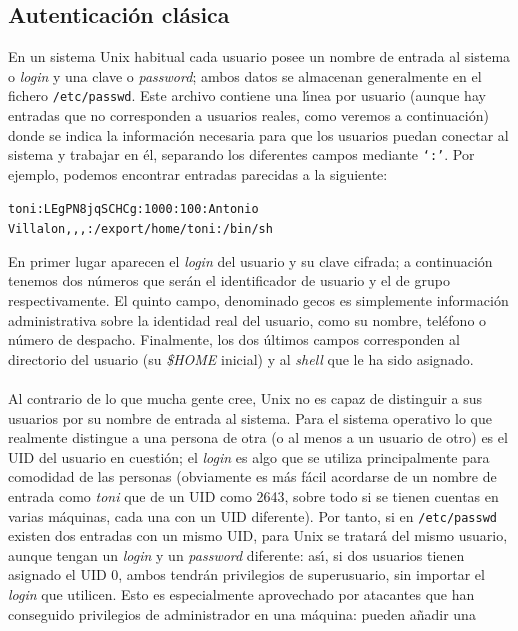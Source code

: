 \subsection{Autenticaci\'on cl\'asica}
En un sistema Unix habitual cada usuario posee un nombre de entrada al sistema
o {\it login} y una clave o {\it password}; ambos datos se almacenan 
generalmente en el fichero {\tt /etc/passwd}. Este archivo contiene una 
l\'{\i}nea por usuario (aunque hay entradas que no corresponden a usuarios 
reales, como veremos a continuaci\'on) donde se indica la informaci\'on 
necesaria para que los usuarios puedan conectar al sistema y trabajar en \'el, 
separando los diferentes campos mediante {\tt `:'}. Por ejemplo, podemos
encontrar entradas parecidas a la siguiente:
\begin{center}
{\tt toni:LEgPN8jqSCHCg:1000:100:Antonio Villalon,,,:/export/home/toni:/bin/sh}\vspace{5pt}\\
\end{center}
En primer lugar aparecen el {\it login} del usuario y su clave cifrada; a 
continuaci\'on tenemos dos n\'umeros que ser\'an el identificador de usuario y
el de grupo respectivamente. El quinto campo, denominado {\sc gecos} es 
simplemente informaci\'on administrativa sobre la identidad real del usuario,
como su nombre, tel\'efono o n\'umero de despacho. Finalmente, los dos \'ultimos
campos corresponden al directorio del usuario (su {\it \$HOME} inicial) y al
{\it shell} que le ha sido asignado.\\
\\Al contrario de lo que mucha gente cree, Unix no es capaz de distinguir a sus
usuarios por su nombre de entrada al sistema. Para el sistema operativo lo que
realmente distingue a una persona de otra (o al menos a un usuario de otro) es
el UID del usuario en cuesti\'on; el {\it login} es algo que se 
utiliza principalmente para comodidad de las personas (obviamente es m\'as 
f\'acil acordarse de un nombre de entrada como {\it toni} que de un UID como 
2643, sobre todo si se tienen cuentas en varias m\'aquinas, cada una con un UID 
diferente). Por tanto, si en {\tt /etc/passwd} existen
dos entradas con un mismo UID, para Unix se tratar\'a del mismo usuario, aunque
tengan un {\it login} y un {\it password} diferente: as\'{\i}, si dos usuarios
tienen asignado el UID 0, ambos tendr\'an privilegios de superusuario, sin
importar el {\it login} que utilicen. Esto es especialmente aprovechado por 
atacantes que han
conseguido privilegios de administrador en una m\'aquina: pueden a\~nadir una 
